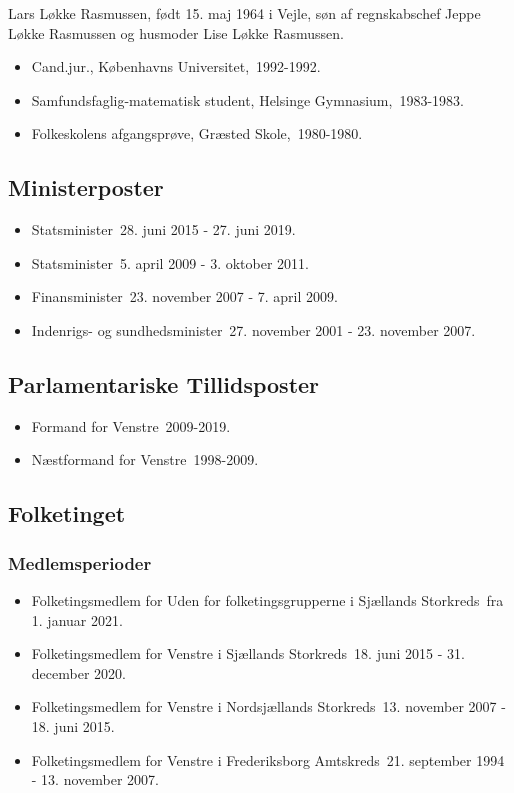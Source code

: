 \documentclass[11pt, a4paper]{awesome-cv}
\begin{document}
\makecvheader[R]
\makelettertitle
\begin{cvletter}
Lars Løkke Rasmussen, født 15. maj 1964 i Vejle, søn af regnskabschef Jeppe Løkke Rasmussen og husmoder Lise Løkke Rasmussen.

\begin{itemize}
\item Cand.jur., Københavns Universitet, 1992-1992.
\item Samfundsfaglig-matematisk student, Helsinge Gymnasium, 1983-1983.
\item Folkeskolens afgangsprøve, Græsted Skole, 1980-1980.
\end{itemize}
\subsection*{Ministerposter}
\begin{itemize}
\item Statsminister 28. juni 2015 - 27. juni 2019.
\item Statsminister 5. april 2009 - 3. oktober 2011.
\item Finansminister 23. november 2007 - 7. april 2009.
\item Indenrigs- og sundhedsminister 27. november 2001 - 23. november 2007.
\end{itemize}
\subsection*{Parlamentariske Tillidsposter}
\begin{itemize}
\item Formand for Venstre 2009-2019.
\item Næstformand for Venstre 1998-2009.
\end{itemize}
\subsection*{Folketinget}
\subsubsection*{Medlemsperioder}
\begin{itemize}
\item Folketingsmedlem for Uden for folketingsgrupperne i Sjællands Storkreds fra 1. januar 2021.
\item Folketingsmedlem for Venstre i Sjællands Storkreds 18. juni 2015 - 31. december 2020.
\item Folketingsmedlem for Venstre i Nordsjællands Storkreds 13. november 2007 - 18. juni 2015.
\item Folketingsmedlem for Venstre i Frederiksborg Amtskreds 21. september 1994 - 13. november 2007.
\end{itemize}

\end{cvletter}
\end{document}
